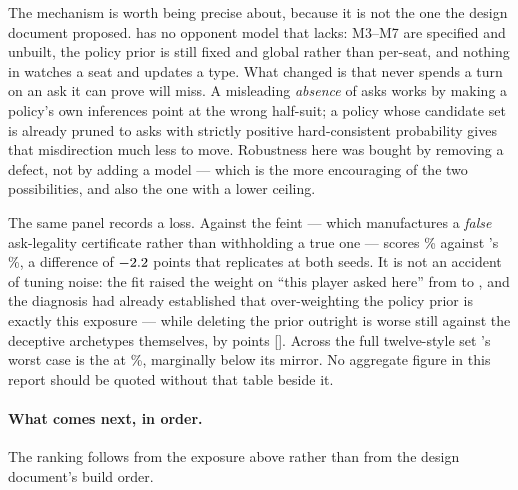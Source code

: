 The mechanism is worth being precise about, because it is not the one the design
document proposed. \vfive{} has no opponent model that \vfour{} lacks: M3--M7
are specified and unbuilt, the policy prior is still fixed and global rather than
per-seat, and nothing in \vfive{} watches a seat and updates a type. What changed is that
\vfive{} never spends a turn on an ask it can prove will miss. A misleading
\emph{absence} of asks works by making a policy's own inferences point at the
wrong half-suit; a policy whose candidate set is already pruned to asks with
strictly positive hard-consistent probability gives that misdirection much less
to move. Robustness here was bought by removing a defect, not by adding a
model --- which is the more encouraging of the two possibilities, and also the
one with a lower ceiling.

The same panel records a loss. Against the feint --- which manufactures a
\emph{false} ask-legality certificate rather than withholding a true one ---
\vfive{} scores \numDecFeintFive\% against \vfour{}'s \numDecFeintFour\%, a
difference of $-2.2$ points that replicates at both seeds. It is
not an accident of tuning noise: the fit raised the weight on ``this player asked here''
from \numPriorThetaFour{} to \numPriorThetaFive{}, and the diagnosis had already
established that over-weighting the policy prior is exactly this exposure ---
while deleting the prior outright is worse still against the deceptive
archetypes themselves, by \numPriorDeleteCost{} points
[\numPriorDeleteCI]. Across the full twelve-style set \vfive{}'s worst case is the
\numDecWorstOpp{} at \numDecWorst\%, marginally below its mirror. No aggregate
figure in this report should be quoted without that table beside it.

\paragraph{What comes next, in order.} The ranking follows from the exposure
above rather than from the design document's build order.

